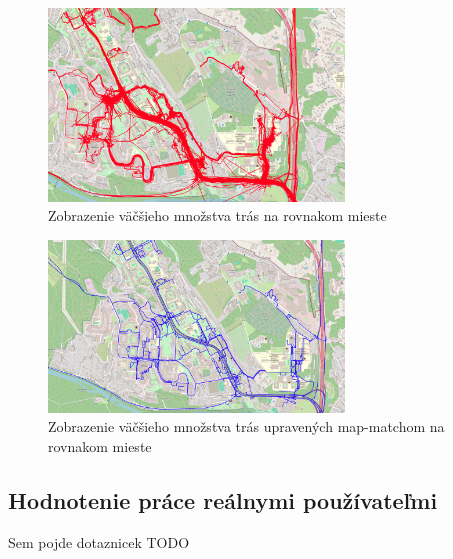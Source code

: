 \begin{figure}[H]
  \centering
  \includegraphics[width=0.7\textwidth]{img/map-match rozdiel/pred map-match.png}
  \caption{Zobrazenie väčšieho množstva trás na rovnakom mieste}
  \label{fig:spagety}
\end{figure}
\begin{figure}[H]
  \centering
  \includegraphics[width=0.7\textwidth]{img/map-match rozdiel/po map-match.png}
  \caption{Zobrazenie väčšieho množstva trás upravených map-matchom na rovnakom mieste}
  \label{fig:niespagety}
\end{figure}

\subsection{Hodnotenie práce reálnymi používateľmi}
Sem pojde dotaznicek TODO

